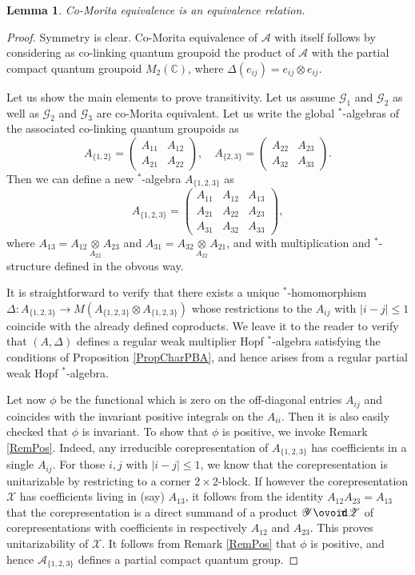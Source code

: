 \documentclass[10pt]{article}
\newcommand{\Circt}{{\mathop{\ooalign{$\ovoid$\cr\hidewidth\raise-.05ex\hbox{$\scriptstyle\mathsf T\mkern3.5mu$}\cr}}}} %
\newcommand{\C}{\mathbb{C}}
\newtheorem{Lem}[Theorem]{Lemma}
\theoremstyle{definition}
\numberwithin{equation}{section}
\begin{document}
\begin{Lem} Co-Morita equivalence is an equivalence relation. 
\end{Lem} 

\begin{proof} Symmetry is clear. Co-Morita equivalence of $\mathscr{A}$ with itself follows by considering as co-linking quantum groupoid the product of $\mathscr{A}$ with the partial compact quantum groupoid $M_2(\C)$, where $\Delta(e_{ij}) = e_{ij}\otimes e_{ij}$. 

Let us show the main elements to prove transitivity. Let us assume $\mathscr{G}_1$ and $\mathscr{G}_2$ as well as $\mathscr{G}_2$ and $\mathscr{G}_3$ are co-Morita equivalent. Let us write the global $^*$-algebras of the associated co-linking quantum groupoids as \[A_{\{1,2\}} = \begin{pmatrix} A_{11} & A_{12} \\ A_{21} & A_{22} \end{pmatrix}, \quad A_{\{2,3\}} = \begin{pmatrix} A_{22} & A_{23} \\ A_{32} & A_{33}\end{pmatrix}.\] Then we can define a new $^*$-algebra $A_{\{1,2,3\}}$ as \[ A_{\{1,2,3\}} = \begin{pmatrix} A_{11} & A_{12} &   A_{13} \\ A_{21} & A_{22} & A_{23} \\ A_{31} & A_{32} & A_{33} \end{pmatrix},\] where $A_{13} = A_{12}\underset{A_{22}}{\otimes } A_{23}$ and $A_{31} = A_{32}\underset{A_{22}}{\otimes} A_{21}$, and with multiplication and $^*$-structure defined in the obvous way. 

It is straightforward to verify that there exists a unique $^*$-homomorphism $\Delta: A_{\{1,2,3\}} \rightarrow M(A_{\{1,2,3\}}\otimes A_{\{1,2,3\}})$ whose restrictions to the $A_{ij}$ with $|i-j|\leq 1$ coincide with the already defined coproducts. We leave it to the reader to verify that $(A,\Delta)$ defines a regular weak multiplier Hopf $^*$-algebra satisfying the conditions of Proposition \ref{PropCharPBA}, and hence arises from a regular partial weak Hopf $^*$-algebra. 

Let now $\phi$ be the functional which is zero on the off-diagonal entries $A_{ij}$ and coincides with the invariant positive integrals on the $A_{ii}$. Then it is also easily checked that $\phi$ is invariant. To show that $\phi$ is positive, we invoke Remark \ref{RemPos}. Indeed, any irreducible corepresentation of $A_{\{1,2,3\}}$ has coefficients in a single $A_{ij}$. For those $i,j$ with $|i-j|\leq 1$, we know that the corepresentation is unitarizable by restricting to a corner $2\times 2$-block. If however the corepresentation $\mathscr{X}$ has coefficients living in (say) $A_{13}$, it follows from the identity $A_{12}A_{23}=A_{13}$ that the corepresentation is a direct summand of a product $\mathscr{Y}\Circt \mathscr{Z}$ of corepresentations with coefficients in respectively $A_{12}$ and $A_{23}$. This proves unitarizability of $\mathscr{X}$. It follows from Remark \ref{RemPos} that $\phi$ is positive, and hence $\mathscr{A}_{\{1,2,3\}}$ defines a partial compact quantum group.  


\end{proof}
\end{document}
